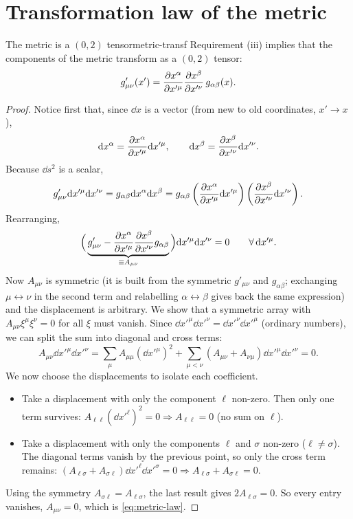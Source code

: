 \section{Transformation law of the metric}

\begin{proposition}{The metric is a $(0,2)$ tensor}{metric-transf}
Requirement (iii) implies that the components of the metric transform as a $(0,2)$ tensor:
\begin{equation}
  g'_{\mu\nu}(x')=\frac{\partial x^\alpha}{\partial x'^\mu}\frac{\partial x^\beta}{\partial x'^\nu}\,g_{\alpha\beta}(x).
  \label{eq:metric-law}
\end{equation}
\end{proposition}
\begin{proof}
Notice first that, since $\dd x$ is a vector (from new to old coordinates, $x'\to x$),
\[
  \mathrm{d} x^\alpha=\frac{\partial x^\alpha}{\partial x'^\mu}\mathrm{d} x'^\mu,\qquad \mathrm{d} x^\beta=\frac{\partial x^\beta}{\partial x'^\nu}\mathrm{d} x'^\nu .
\]
Because $\dd s^2$ is a scalar,
\[
  g'_{\mu\nu}\mathrm{d} x'^\mu\mathrm{d} x'^\nu=g_{\alpha\beta}\mathrm{d} x^\alpha\mathrm{d} x^\beta=g_{\alpha\beta}\left(\frac{\partial x^\alpha}{\partial x'^\mu}\mathrm{d} x'^\mu\right)\left(\frac{\partial x^\beta}{\partial x'^\nu}\mathrm{d} x'^\nu\right).
\]
Rearranging,
\[
  \Big(\underbrace{g'_{\mu\nu}-\frac{\partial x^\alpha}{\partial x'^\mu}\frac{\partial x^\beta}{\partial x'^\nu}g_{\alpha\beta}}_{\equiv A_{\mu\nu}}\Big)\mathrm{d} x'^\mu\mathrm{d} x'^\nu=0\qquad\forall\,\mathrm{d} x'^\mu .
\]
Now $A_{\mu\nu}$ is symmetric (it is built from the symmetric $g'_{\mu\nu}$ and $g_{\alpha\beta}$; exchanging $\mu\leftrightarrow\nu$ in the second term and relabelling $\alpha\leftrightarrow\beta$ gives back the same expression) and the displacement is arbitrary. We show that a symmetric array with $A_{\mu\nu}\xi^\mu\xi^\nu=0$ for all $\xi$ must vanish. Since $\dd x'^\mu\dd x'^\nu=\dd x'^\nu\dd x'^\mu$ (ordinary numbers), we can split the sum into diagonal and cross terms:
\[
  A_{\mu\nu}\dd x'^\mu\dd x'^\nu=\sum_\mu A_{\mu\mu}(\dd x'^\mu)^2+\sum_{\mu<\nu}(A_{\mu\nu}+A_{\nu\mu})\dd x'^\mu\dd x'^\nu=0 .
\]
We now choose the displacements to isolate each coefficient.
\begin{itemize}
\item Take a displacement with only the component $\ell$ non-zero. Then only one term survives: $A_{\ell\ell}(\dd x'^\ell)^2=0\Rightarrow A_{\ell\ell}=0$ (no sum on $\ell$).
\item Take a displacement with only the components $\ell$ and $\sigma$ non-zero ($\ell\neq\sigma$). The diagonal terms vanish by the previous point, so only the cross term remains: $(A_{\ell\sigma}+A_{\sigma\ell})\dd x'^\ell\dd x'^\sigma=0\Rightarrow A_{\ell\sigma}+A_{\sigma\ell}=0$.
\end{itemize}
Using the symmetry $A_{\sigma\ell}=A_{\ell\sigma}$, the last result gives $2A_{\ell\sigma}=0$. So every entry vanishes, $A_{\mu\nu}=0$, which is \eqref{eq:metric-law}.
\end{proof}


